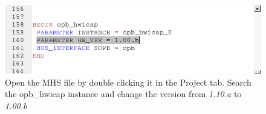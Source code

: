 \documentclass[a4paper,oneside]{memoir}
\begin{document}
\begin{figure}[H]
\centering
\includegraphics[scale=0.5]{HWICAP3}
\caption{Open the MHS file by double clicking it in the Project tab. Search the opb\_hwicap instance and change the version from \emph{1.10.a} to \emph{1.00.b}\label{fig:HWICAP3}}
\end{figure}
%
\end{document}
